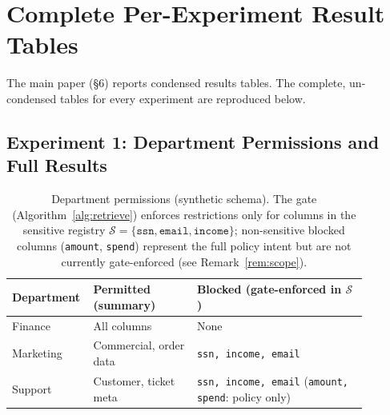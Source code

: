 \documentclass[9pt,twocolumn,twoside]{extarticle}
\begin{document}
\section{Complete Per-Experiment Result Tables}
\label{sec:supp-tables}
The main paper (\S6) reports condensed results tables. The complete,
un-condensed tables for every experiment are reproduced below.

\subsection{Experiment 1: Department Permissions and Full Results}
\begin{table}[h]
\centering
\caption{Department permissions (synthetic schema).
The gate (Algorithm~\ref{alg:retrieve}) enforces restrictions only for
columns in the sensitive registry
$\mathcal{S} = \{\texttt{ssn},\texttt{email},\texttt{income}\}$;
non-sensitive blocked columns (\texttt{amount}, \texttt{spend}) represent
the full policy intent but are not currently gate-enforced
(see Remark~\ref{rem:scope}).}
\label{tab:perms}
\small
\begin{tabular}{@{}p{0.14\linewidth}p{0.28\linewidth}p{0.46\linewidth}@{}}
\toprule
\textbf{Department} & \textbf{Permitted (summary)} & \textbf{Blocked (gate-enforced in $\mathcal{S}$)} \\
\midrule
Finance   & All columns            & None \\
Marketing & Commercial, order data & \texttt{ssn, income, email} \\
Support   & Customer, ticket meta  & \texttt{ssn, income, email} (\texttt{amount, spend}: policy only) \\
\bottomrule
\end{tabular}
\end{table}
\end{document}
